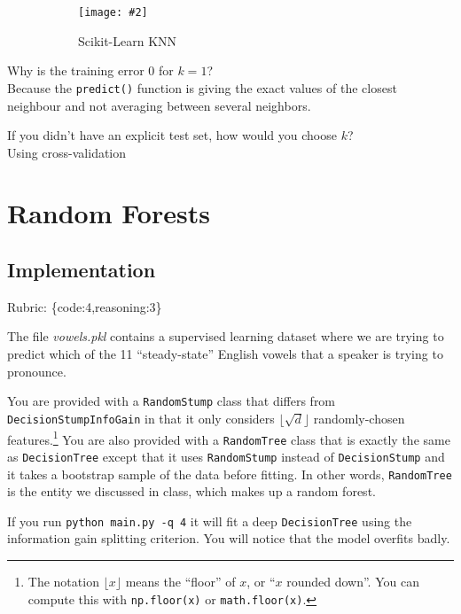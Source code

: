 \documentclass{article}
\def\rubric#1{\gre{Rubric: \{#1\}}}{}
\def\gre#1{{\color{gre}#1}}
\def\ans#1{{\color{ans}#1}}
\newcommand{\centerfig}[2]{\begin{center}\texttt{[image: \#2]}\end{center}}
\begin{document}
{{\begin{figure}[htp]
\begin{subfigure}[b]{0.5\textwidth}
     \label{fig:1}
   \end{subfigure}
   \begin{subfigure}[b]{0.5\textwidth} \color{ans}
       \centerfig{1}{../figs/q3_3_scikitKNN}
      {
          \begin{center}
            Scikit-Learn KNN
          \end{center}
      }
     \label{fig:2}
   \end{subfigure}
\end{figure}
\clearpage
\item Why is the training error $0$ for $k=1$? \\
\ans{
   Because the \texttt{predict()} function is giving the exact values of the closest neighbour and not 
   averaging between several neighbors.
}
\item If you didn't have an explicit test set, how would you choose $k$? \\
\ans{
   Using cross-validation
}
}}


\section{Random Forests}

\subsection{Implementation}
\rubric{code:4,reasoning:3}

The file \emph{vowels.pkl} contains a supervised learning dataset where we are trying to predict which of the 11 ``steady-state'' English vowels that a speaker is trying to pronounce.

You are provided with a \texttt{RandomStump} class that differs from
\texttt{DecisionStumpInfoGain} in that
it only considers $\lfloor \sqrt{d} \rfloor$ randomly-chosen features.\footnote{The notation $\lfloor x\rfloor$ means the ``floor'' of $x$, or ``$x$ rounded down''. You can compute this with \texttt{np.floor(x)} or \texttt{math.floor(x)}.}
You are also provided with a \texttt{RandomTree} class that is exactly the same as
\texttt{DecisionTree} except that it uses \texttt{RandomStump} instead of
\texttt{DecisionStump} and it takes a bootstrap sample of the data before fitting.
In other words, \texttt{RandomTree} is the entity we discussed in class, which
makes up a random forest.

If you run \texttt{python main.py -q 4} it will fit a deep \texttt{DecisionTree}
using the information gain splitting criterion. You will notice that the model overfits badly.
\end{document}
